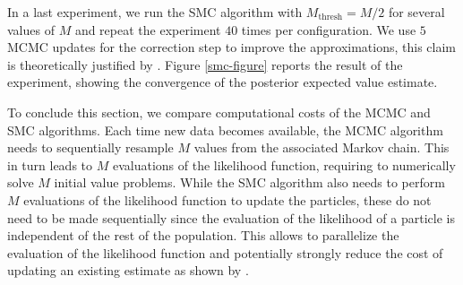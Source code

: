 In a last experiment, we run the SMC algorithm with $M_\text{thresh} = M/2$ for several values of $M$ and repeat the experiment $40$ times per configuration. We use $5$ MCMC updates for the correction step to improve the approximations, this claim is theoretically justified by \cite{marion2018finite}. Figure \ref{smc-figure} reports the result of the experiment, showing the convergence of the posterior expected value estimate.

To conclude this section, we compare computational costs of the MCMC and SMC algorithms. Each time new data becomes available, the MCMC algorithm needs to sequentially resample $M$ values from the associated Markov chain. This in turn leads to $M$ evaluations of the likelihood function, requiring to numerically solve $M$ initial value problems. While the SMC algorithm also needs to perform $M$ evaluations of the likelihood function to update the particles, these do not need to be made sequentially since the evaluation of the likelihood of a particle is independent of the rest of the population. This allows to parallelize the evaluation of the likelihood function and potentially strongly reduce the cost of updating an existing estimate as shown by \cite{lee2010utility}.

